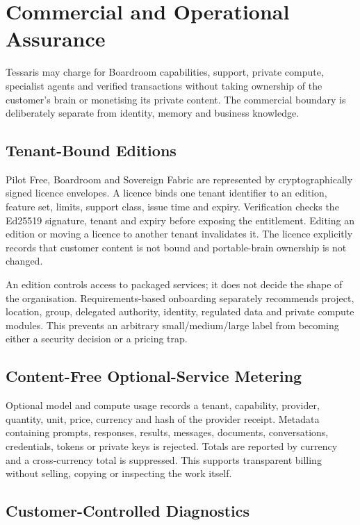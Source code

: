 \section{Commercial and Operational Assurance}
\label{sec:aion-commercial-assurance}

Tessaris may charge for Boardroom capabilities, support, private compute, specialist agents and
verified transactions without taking ownership of the customer's brain or monetising its private
content.  The commercial boundary is deliberately separate from identity, memory and business
knowledge.

\subsection{Tenant-Bound Editions}

Pilot Free, Boardroom and Sovereign Fabric are represented by cryptographically signed licence
envelopes.  A licence binds one tenant identifier to an edition, feature set, limits, support class,
issue time and expiry.  Verification checks the Ed25519 signature, tenant and expiry before exposing
the entitlement.  Editing an edition or moving a licence to another tenant invalidates it.  The
licence explicitly records that customer content is not bound and portable-brain ownership is not
changed.

An edition controls access to packaged services; it does not decide the shape of the organisation.
Requirements-based onboarding separately recommends project, location, group, delegated authority,
identity, regulated data and private compute modules.  This prevents an
arbitrary small/medium/large label from becoming either a security decision or a pricing trap.

\subsection{Content-Free Optional-Service Metering}

Optional model and compute usage records a tenant, capability, provider, quantity, unit, price,
currency and hash of the provider receipt.  Metadata containing prompts, responses, results,
messages, documents, conversations, credentials, tokens or private keys is rejected.  Totals are
reported by currency and a cross-currency total is suppressed.  This supports transparent billing
without selling, copying or inspecting the work itself.

\subsection{Customer-Controlled Diagnostics}

